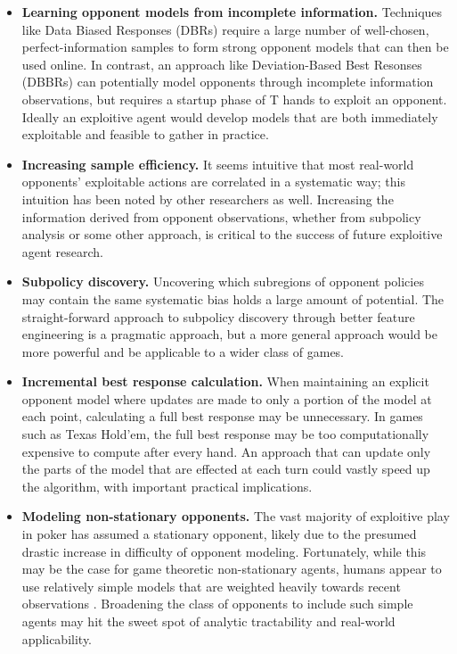 \documentclass{aamas2013}
\begin{document}
\begin{itemize}
\item \textbf{Learning opponent models from incomplete information.} Techniques like Data Biased Responses (DBRs) \cite{dbr} require a large number of well-chosen, perfect-information samples to form strong opponent models that can then be used online. In contrast, an approach like Deviation-Based Best Resonses (DBBRs) \cite{dbbr} can potentially model opponents through incomplete information observations, but requires a startup phase of T hands to exploit an opponent. Ideally an exploitive agent would develop models that are both immediately exploitable and feasible to gather in practice.

\item \textbf{Increasing sample efficiency.} It seems intuitive that most real-world opponents' exploitable actions are correlated in a systematic way; this intuition has been noted by other researchers \cite{shortterm} as well. Increasing the information derived from opponent observations, whether from subpolicy analysis or some other approach, is critical to the success of future exploitive agent research.

\item \textbf{Subpolicy discovery.} Uncovering which subregions of opponent policies may contain the same systematic bias holds a large amount of potential. The straight-forward approach to subpolicy discovery through better feature engineering is a pragmatic approach, but a more general approach would be more powerful and be applicable to a wider class of games.

\item \textbf{Incremental best response calculation.} When maintaining an explicit opponent model where updates are made to only a portion of the model at each point, calculating a full best response may be unnecessary. In games such as Texas Hold'em, the full best response may be too computationally expensive to compute after every hand. An approach that can update only the parts of the model that are effected at each turn could vastly speed up the algorithm, with important practical implications.

\item \textbf{Modeling non-stationary opponents.} The vast majority of exploitive play in poker has assumed a stationary opponent, likely due to the presumed drastic increase in difficulty of opponent modeling. Fortunately, while this may be the case for game theoretic non-stationary agents, humans appear to use relatively simple models that are weighted heavily towards recent observations \cite{simplemodels}. Broadening the class of opponents to include such simple agents may hit the sweet spot of analytic tractability and real-world applicability.


\end{itemize}
\end{document}
